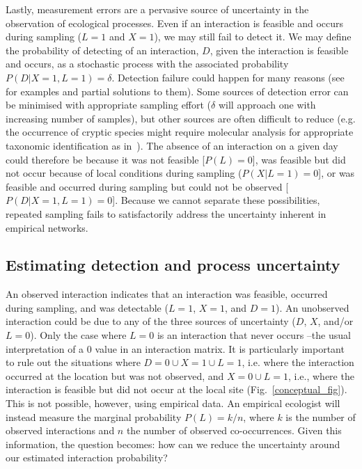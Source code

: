 \documentclass[12pt]{article}
\begin{document}
\begin{spacing}{2.0}
          Lastly, measurement errors are a pervasive source of uncertainty in the observation of ecological processes. Even if an interaction is feasible and occurs during sampling ($L = 1$ and $X = 1$), we may still fail to detect it. We may define the probability of detecting of an interaction, $D$, given the interaction is feasible and occurs, as a stochastic process with the associated probability $P(D|X=1,L=1)=\delta$. Detection failure could happen for many reasons (see~\citet{Wirta2014} for examples and partial solutions to them). Some sources of detection error can be minimised with appropriate sampling effort ($\delta$ will approach one with increasing number of samples), but other sources are often difficult to reduce (e.g. the occurrence of cryptic species might require molecular analysis for appropriate taxonomic identification as in~\citealt{Wirta2014,Frost2016}). The absence of an interaction on a given day could therefore be because it was not feasible [$P(L) = 0$], was feasible but did not occur because of local conditions during sampling ($P(X|L=1) = 0$], or was feasible and occurred during sampling but could not be observed [$P(D|X=1,L=1)=0$]. Because we cannot separate these possibilities, repeated sampling fails to satisfactorily address the uncertainty inherent in empirical networks.


    \subsection*{Estimating detection and process uncertainty}

        An observed interaction indicates that an interaction was feasible, occurred during sampling, and was detectable ($L = 1$, $X = 1$, and $D = 1$). An unobserved interaction could be due to any of the three sources of uncertainty ($D$, $X$, and/or $L = 0$). Only the case where $L = 0$ is an interaction that never occurs --the usual interpretation of a $0$ value in an interaction matrix. It is particularly important to rule out the situations where $D=0 \cup X = 1 \cup L=1$, i.e. where the interaction occurred at the location but was not observed, and $X = 0 \cup L =1$, i.e., where the interaction is feasible but did not occur at the local site (Fig.~\ref{conceptual_fig}). 
        This is not possible, however, using empirical data. An empirical ecologist will instead measure the marginal probability $P(L) = k/n$, where $k$ is the number of observed interactions and $n$ the number of observed co-occurrences. Given this information, the question becomes: how can we reduce the uncertainty around our estimated interaction probability?



\end{spacing}
\end{document}
